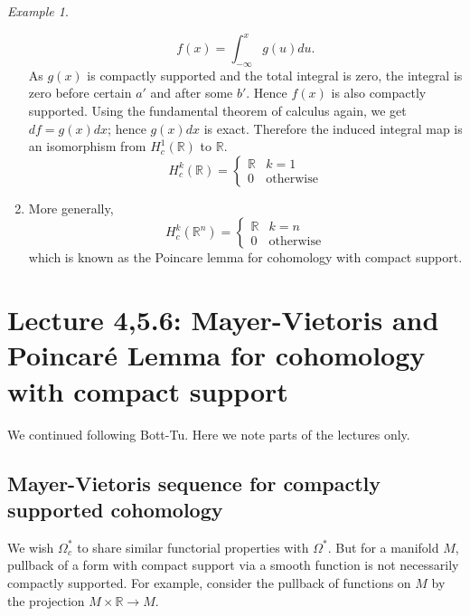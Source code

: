 \documentclass[12pt]{amsart}
\newcommand{\R}{\mathbb{R}} %
\theoremstyle{remark}
\newtheorem{example}{Example}
\begin{document}
\begin{example}
\begin{enumerate}
\begin{equation*}
            f(x)= \int_{-\infty}^x g(u)du.
        \end{equation*}
        As $g(x)$ is compactly supported and the total integral is zero, the integral is zero before certain $a'$ and after some $b'$. Hence $f(x)$ is also compactly supported. Using the fundamental theorem of calculus again, we get $df=g(x)dx$; hence $g(x)dx$ is exact. Therefore the induced integral map is an isomorphism from $H^1_c(\R)$ to $\R$.
        \begin{equation*}
            H_c^k(\R) = 
            \begin{cases} 
            \mathbb{R} & k=1 \\
            0 & \text{otherwise}
            \end{cases}
        \end{equation*}
        \item More generally,
        \begin{equation*}
            H_c^k(\R^n) = 
            \begin{cases} 
            \mathbb{R} & k=n \\
            0 & \text{otherwise}
            \end{cases}
        \end{equation*}
        which is known as the Poincare lemma for cohomology with compact support.
        
    \end{enumerate}
\end{example}



\section{Lecture 4,5.6: Mayer-Vietoris and Poincaré Lemma for cohomology with compact support}

We continued following Bott-Tu. Here we note parts of the lectures only.

\subsection{Mayer-Vietoris sequence for compactly supported cohomology}

We wish $\Omega_c^{*}$ to share similar functorial properties with $\Omega^{*}$. But for a manifold $M$, pullback of a form with compact support via a smooth function is not necessarily compactly supported. For example, consider the pullback of functions on $M$ by the projection $M \times \R \to M$. 
\end{document}
